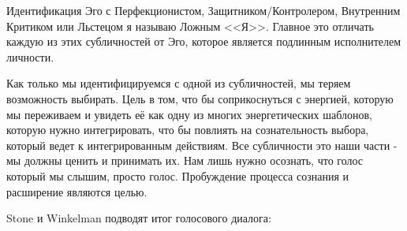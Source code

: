 \documentclass[10pt, fleqn]{article}
\begin{document}
Идентификация Эго с Перфекционистом, Защитником/Контролером, Внутренним Критиком или Льстецом я называю Ложным <<Я>>. Главное это отличать каждую из этих субличностей от Эго, которое является подлинным исполнителем личности.


Как только мы идентифицируемся с одной из субличностей, мы теряем возможность выбирать. Цель в том, что бы соприкоснуться с энергией, которую мы переживаем и увидеть её как одну из многих энергетических шаблонов, которую нужно интегрировать, что бы повлиять на сознательность выбора, который ведет к интегрированным действиям. Все субличности это наши части - мы должны ценить и принимать их. Нам лишь нужно осознать, что голос который мы слышим, просто голос. Пробуждение процесса сознания и расширение являются целью. 

Stone и Winkelman подводят итог голосового диалога:
\end{document}
